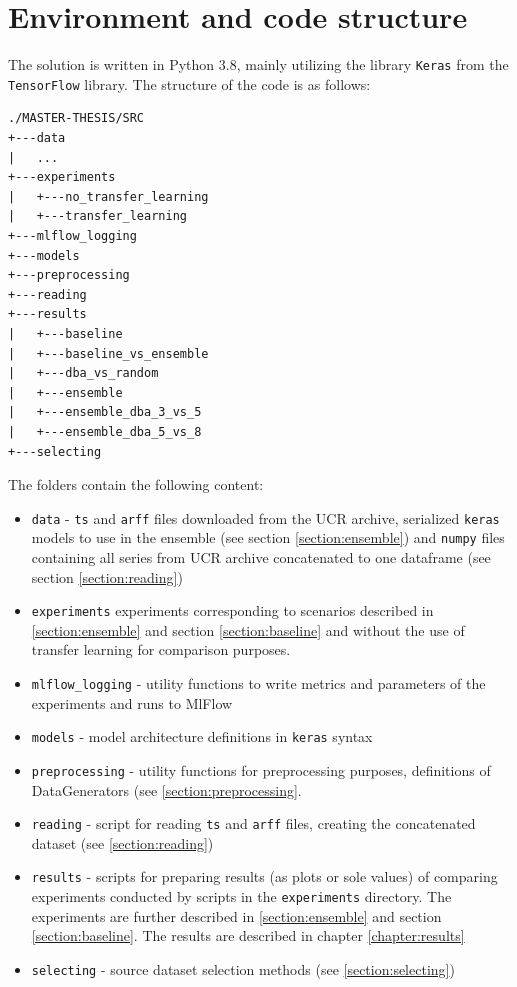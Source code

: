 \documentclass[a4paper,11pt,twoside]{report}
\theoremstyle{definition}
\begin{document}
\section{Environment and code structure}
The solution is written in Python 3.8, mainly utilizing the library \texttt{Keras} from the \texttt{TensorFlow} library. The structure of the code is as follows:

\begin{verbatim}
./MASTER-THESIS/SRC
+---data
|   ...
+---experiments
|   +---no_transfer_learning
|   +---transfer_learning
+---mlflow_logging
+---models
+---preprocessing
+---reading
+---results
|   +---baseline
|   +---baseline_vs_ensemble
|   +---dba_vs_random
|   +---ensemble
|   +---ensemble_dba_3_vs_5
|   +---ensemble_dba_5_vs_8
+---selecting
\end{verbatim}

The folders contain the following content:
\begin{itemize}
\item \texttt{data} - \texttt{ts} and \texttt{arff} files downloaded from the UCR archive,   serialized \texttt{keras} models to use in the ensemble (see section  \ref{section:ensemble}) and \texttt{numpy} files containing all series from UCR archive concatenated to one dataframe (see section \ref{section:reading})
\item \texttt{experiments}  experiments corresponding to scenarios described in \ref{section:ensemble} and section \ref{section:baseline} and without the use of transfer learning for comparison purposes.
\item \texttt{mlflow\_logging} - utility functions to write metrics and parameters of the experiments and runs to MlFlow
\item \texttt{models} - model architecture definitions in \texttt{keras} syntax
\item \texttt{preprocessing} - utility functions for preprocessing purposes, definitions of DataGenerators (see \ref{section:preprocessing}.
\item \texttt{reading} - script for reading \texttt{ts} and \texttt{arff} files, creating the concatenated dataset (see \ref{section:reading})
\item \texttt{results} - scripts for preparing results (as plots or sole values) of comparing experiments conducted by scripts in the \texttt{experiments} directory. The experiments are further described in \ref{section:ensemble} and section \ref{section:baseline}. The results are described in chapter \ref{chapter:results}
\item \texttt{selecting} - source dataset selection methods (see \ref{section:selecting})

\end{itemize}
\end{document}

